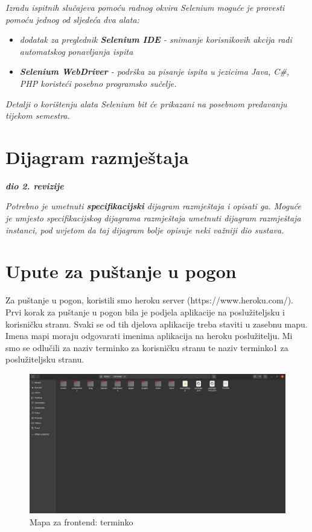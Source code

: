 			 \textit{Izradu ispitnih slučajeva pomoću radnog okvira Selenium moguće je provesti pomoću jednog od sljedeća dva alata:}
			 \begin{itemize}
			 	\item \textit{dodatak za preglednik \textbf{Selenium IDE} - snimanje korisnikovih akcija radi automatskog ponavljanja ispita	}
			 	\item \textit{\textbf{Selenium WebDriver} - podrška za pisanje ispita u jezicima Java, C\#, PHP koristeći posebno programsko sučelje.}
			 \end{itemize}
		 	\textit{Detalji o korištenju alata Selenium bit će prikazani na posebnom predavanju tijekom semestra.}
			
			\eject 
		
		
		\section{Dijagram razmještaja}
			
			\textbf{\textit{dio 2. revizije}}
			
			 \textit{Potrebno je umetnuti \textbf{specifikacijski} dijagram razmještaja i opisati ga. Moguće je umjesto specifikacijskog dijagrama razmještaja umetnuti dijagram razmještaja instanci, pod uvjetom da taj dijagram bolje opisuje neki važniji dio sustava.}
			
			\eject 
		
		\section{Upute za puštanje u pogon}
		
			Za puštanje u pogon, koristili smo heroku server (https://www.heroku.com/). Prvi korak za puštanje u pogon bila je podjela aplikacije na poslužiteljsku i korisničku stranu. Svaki se od tih djelova aplikacije treba staviti u zasebnu mapu. Imena mapi moraju odgovarati imenima aplikacija na heroku poslužitelju. Mi smo se odlučili za naziv terminko za korisničku stranu te naziv terminko1 za poslužiteljsku stranu.
			
			\begin{figure}[H]
				\centering
				\includegraphics[scale=0.25]{slike/FrontendMapa.PNG}
				\caption{Mapa za frontend: terminko}
				\label{fig:promjene}
			\end{figure}
			
